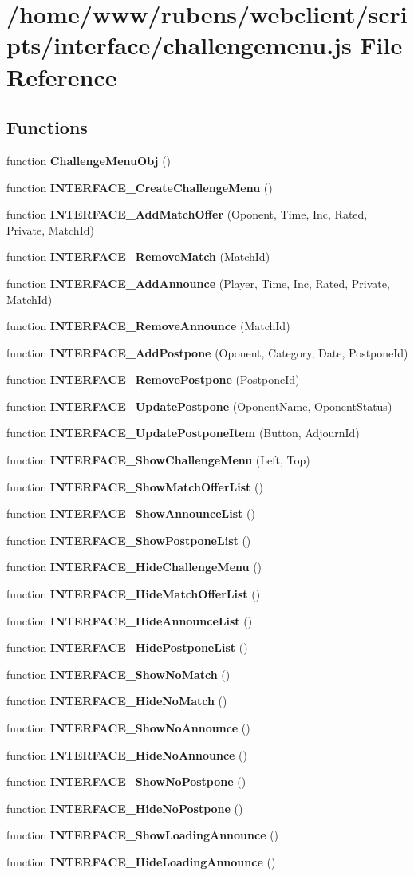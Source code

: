 \section{/home/www/rubens/webclient/scripts/interface/challengemenu.js File Reference}
\label{challengemenu_8js}
\subsection*{Functions}
\begin{CompactItemize}
\item 
function {\bf ChallengeMenuObj} ()
\item 
function {\bf INTERFACE\_\-CreateChallengeMenu} ()
\item 
function {\bf INTERFACE\_\-AddMatchOffer} (Oponent, Time, Inc, Rated, Private, MatchId)
\item 
function {\bf INTERFACE\_\-RemoveMatch} (MatchId)
\item 
function {\bf INTERFACE\_\-AddAnnounce} (Player, Time, Inc, Rated, Private, MatchId)
\item 
function {\bf INTERFACE\_\-RemoveAnnounce} (MatchId)
\item 
function {\bf INTERFACE\_\-AddPostpone} (Oponent, Category, Date, PostponeId)
\item 
function {\bf INTERFACE\_\-RemovePostpone} (PostponeId)
\item 
function {\bf INTERFACE\_\-UpdatePostpone} (OponentName, OponentStatus)
\item 
function {\bf INTERFACE\_\-UpdatePostponeItem} (Button, AdjournId)
\item 
function {\bf INTERFACE\_\-ShowChallengeMenu} (Left, Top)
\item 
function {\bf INTERFACE\_\-ShowMatchOfferList} ()
\item 
function {\bf INTERFACE\_\-ShowAnnounceList} ()
\item 
function {\bf INTERFACE\_\-ShowPostponeList} ()
\item 
function {\bf INTERFACE\_\-HideChallengeMenu} ()
\item 
function {\bf INTERFACE\_\-HideMatchOfferList} ()
\item 
function {\bf INTERFACE\_\-HideAnnounceList} ()
\item 
function {\bf INTERFACE\_\-HidePostponeList} ()
\item 
function {\bf INTERFACE\_\-ShowNoMatch} ()
\item 
function {\bf INTERFACE\_\-HideNoMatch} ()
\item 
function {\bf INTERFACE\_\-ShowNoAnnounce} ()
\item 
function {\bf INTERFACE\_\-HideNoAnnounce} ()
\item 
function {\bf INTERFACE\_\-ShowNoPostpone} ()
\item 
function {\bf INTERFACE\_\-HideNoPostpone} ()
\item 
function {\bf INTERFACE\_\-ShowLoadingAnnounce} ()
\item 
function {\bf INTERFACE\_\-HideLoadingAnnounce} ()
\end{CompactItemize}


